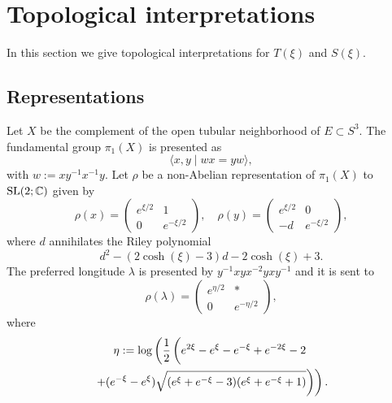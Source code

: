 \section{Topological interpretations}\label{sec:CST}
In this section we give topological interpretations for $T(\xi)$ and $S(\xi)$.
\subsection{Representations}
Let $X$ be the complement of the open tubular neighborhood of $E\subset S^3$.
The fundamental group $\pi_1(X)$ is presented as
\begin{equation*}
  \langle
    x,y
    \mid
    wx=yw
  \rangle,
\end{equation*}
with $w:=xy^{-1}x^{-1}y$.
Let $\rho$ be a non-Abelian representation of $\pi_1(X)$ to $\rm{SL}(2;\mathbb{C})$ given by
\begin{equation}\label{eq:presentation_F_2}
  \rho(x)
  =
  \begin{pmatrix}e^{\xi/2}&1\\0&e^{-\xi/2}\end{pmatrix},
  \quad
  \rho(y)
  =
  \begin{pmatrix}e^{\xi/2}&0\\-d&e^{-\xi/2}\end{pmatrix},
\end{equation}
where $d$ annihilates the Riley polynomial
\begin{equation}\label{eq:Riley}
  d^2-(2\cosh(\xi)-3)d-2\cosh(\xi)+3.
\end{equation}
The preferred longitude $\lambda$ is presented by $y^{-1}xyx^{-2}yxy^{-1}$ and it is sent to
\begin{equation*}
  \rho(\lambda)
  =
  \begin{pmatrix}
    e^{\eta/2}&\ast \\
    0          &e^{-\eta/2}
  \end{pmatrix},
\end{equation*}
where
\begin{multline*}
  \eta
  :=
  \log
  \left(
    \frac{1}{2}
    \left(\vphantom{\frac{1}{2}}
      e^{2\xi}-e^{\xi}-e^{-\xi}+e^{-2\xi}-2
    \right.
  \right.
  \\
  \left.
    \left.
      +(e^{-\xi}-e^{\xi})\sqrt{(e^{\xi}+e^{-\xi}-3)(e^{\xi}+e^{-\xi}+1)}
    \right)
  \right).
\end{multline*}
